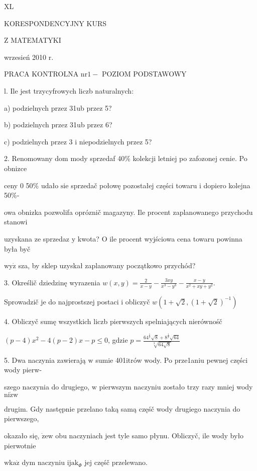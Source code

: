 \documentclass[a4paper,12pt]{article}
\begin{document}
XL

KORESPONDENCYJNY KURS

Z MATEMATYKI

wrzesień 2010 r.

PRACA KONTROLNA $\mathrm{n}\mathrm{r} 1-$ POZIOM PODSTAWOWY

l. Ile jest trzycyfrowych liczb naturalnych:

a) podzielnych przez 31ub przez 5?

b) podzielnych przez 31ub przez 6?

c) podzielnych przez 3 $\mathrm{i}$ niepodzielnych przez 5?

2. Renomowany dom mody sprzedaf 40\% kolekcji letniej po zafozonej cenie. Po obnizce

ceny $0$ 50\% udało $\mathrm{s}\mathrm{i}\mathrm{e}$ sprzedač połowę pozostałej części towaru $\mathrm{i}$ dopiero kolejna 50\%-

owa obnizka pozwolifa opróznič magazyny. Ile procent zaplanowanego przychodu stanowi

uzyskana ze sprzedaz $\mathrm{y}$ kwota? $\mathrm{O}$ ile procent wyjściowa cena towaru powinna była byč

$\mathrm{w}\mathrm{y}\dot{\mathrm{z}}$ sza, by sklep uzyskał zaplanowany początkowo przychód?

3. Określič dziedzinę wyrazenia $w(x,y)=\displaystyle \frac{2}{x-y}-\frac{3xy}{x^{3}-y^{3}}-\frac{x-y}{x^{2}+xy+y^{2}}.$

Sprowadzič je do najprostszej postaci $\mathrm{i}$ obliczyč $w(1+\sqrt{2},(1+\sqrt{2})^{-1})$

4. Obliczyč sumę wszystkich liczb pierwszych spelniających nierównośč

$(p-4)x^{2}-4(p-2)x-p\leq 0$, gdzie $p=\displaystyle \frac{64^{\frac{1}{3}}\sqrt{8}+8^{\frac{1}{3}}\sqrt{64}}{\sqrt[3]{64\sqrt{8}}}$

5. Dwa naczynia zawierają $\mathrm{w}$ sumie 401itrów wody. Po prze1aniu pewnej części wody pierw-

szego naczynia do drugiego, $\mathrm{w}$ pierwszym naczyniu zostało trzy razy mniej wody $\mathrm{n}\mathrm{i}\dot{\mathrm{z}}\mathrm{w}$

drugim. Gdy następnie przelano taką samą częśč wody drugiego naczynia do pierwszego,

okazało się, $\dot{\mathrm{z}}\mathrm{e}\mathrm{w}$ obu naczyniach jest tyle samo płynu. Obliczyč, ile wody było pierwotnie

$\mathrm{w}\mathrm{k}\mathrm{a}\dot{\mathrm{z}}$ dym naczyniu $\mathrm{i}\mathrm{j}\mathrm{a}\mathrm{k}_{\Phi}$ jej częśč przelewano.
\end{document}
